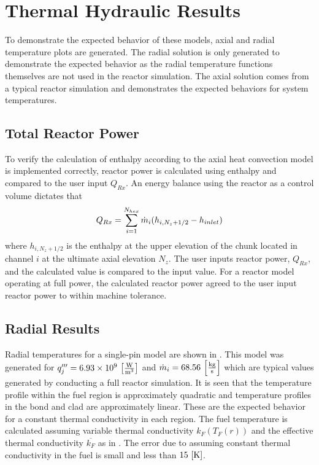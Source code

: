 \section{Thermal Hydraulic Results}
  To demonstrate the expected behavior of these models, axial and radial
  temperature plots are generated. The radial solution is only generated to
  demonstrate the expected behavior as the radial temperature functions
  themselves are not used in the reactor simulation. The axial solution comes
  from a typical reactor simulation and demonstrates the expected behaviors for
  system temperatures.
  
  \subsection{Total Reactor Power}
    To verify the calculation of enthalpy according to the axial heat convection
    model is implemented correctly, reactor power is calculated using enthalpy
    and compared to the user input $Q_{Rx}$. An energy balance using the reactor
    as a control volume dictates that
    \begin{equation}
      \label{eq:reactor_energy_balance}
      Q_{Rx} = \sum_{i=1}^{N_{hex}} \dot{m}_i (h_{i,N_z+1/2} - h_{inlet})
    \end{equation}
    where $h_{i,N_z+1/2}$ is the enthalpy at the upper elevation of the chunk
    located in channel $i$ at the ultimate axial elevation $N_z$. The user
    inputs reactor power, $Q_{Rx}$, and the calculated value is compared to the
    input value. For a reactor model operating at full power, the calculated
    reactor power agreed to the user input reactor power to within machine
    tolerance.

  \subsection{Radial Results}
    Radial temperatures for a single-pin model are shown in
    . This model was generated for 
    ${q'''_j = 6.93 \times 10^9 \,\left[\text{{$\frac{\text{W}}{\text{m}^3}$}}\right]}$ and 
    ${\dot{m}_i = 68.56 \,\left[\text{{$\frac{\text{kg}}{\text{s}}$}}\right]}$ which are typical 
    values generated by conducting a full reactor simulation. It is seen
    that the temperature profile within the fuel region is approximately 
    quadratic and temperature profiles in the bond and clad are approximately
    linear. These are the expected behavior for a constant thermal conductivity
    in each region. The fuel temperature is calculated assuming variable thermal
    conductivity $k_F(T_F(r))$ and the effective thermal conductivity
    $\overline{k_F}$ as in . The error due to assuming
    constant thermal conductivity in the fuel is small and less than $15
    \,\left[\text{{K}}\right]$.

